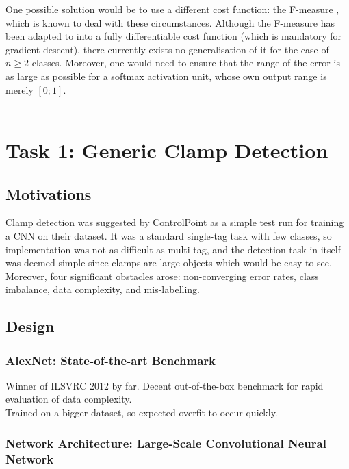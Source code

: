 \documentclass[a4paper,11pt]{article}
\begin{document}
One possible solution would be to use a different cost function: the F-measure \cite{f-measure}, which is known to deal with these circumstances. Although the F-measure has been adapted to into a fully differentiable cost function (which is mandatory for gradient descent), there currently exists no generalisation of it for the case of $n \ge 2$
classes. Moreover, one would need to ensure that the range of the error is as large as possible for a softmax activation unit, whose own output range is merely $[0;1]$. \\ \\




\clearpage

\section{Task 1: Generic Clamp Detection}


\subsection{Motivations}

Clamp detection was suggested by ControlPoint as a simple test run for training a CNN on their dataset. It was a standard single-tag task with few classes, so implementation was not as difficult as multi-tag, and the detection task in itself was deemed simple since clamps are large objects which would be easy to see. Moreover, four significant obstacles arose: non-converging error rates, class imbalance, data complexity, and mis-labelling.\\

\subsection{Design}

\subsubsection{AlexNet: State-of-the-art Benchmark}

Winner of ILSVRC 2012 by far. Decent out-of-the-box benchmark for rapid evaluation of data complexity. \\
Trained on a bigger dataset, so expected overfit to occur quickly. \\

\subsubsection{Network Architecture: Large-Scale Convolutional Neural Network}
\end{document}
